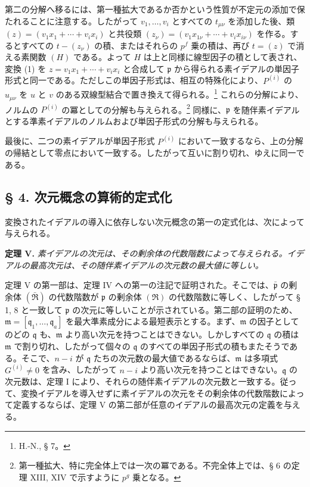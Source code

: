 \documentclass[11pt]{article}
\providecommand{\mR}{\mathfrak{R}}
\providecommand{\frakm}{\mathfrak m}
\providecommand{\frakp}{\mathfrak p}
\providecommand{\frakq}{\mathfrak q}
\providecommand{\mR}{\mathfrak{R}}
\providecommand{\frakp}{\mathfrak p}
\providecommand{\frakq}{\mathfrak q}
\begin{document}
第二の分解へ移るには、第一種拡大であるか否かという性質が不定元の添加で保たれることに注意する。したがって $v_1,\ldots,v_i$ とすべての $t_{\mu\nu}$ を添加した後、類 $(z)=(v_1x_1+\cdots+v_ix_i)$ と共役類 $(z_\nu)=(v_1x_{1\nu}+\cdots+v_ix_{i\nu})$ を作る。するとすべての $t-(z_\nu)$ の積、またはそれらの $p^f$ 乗の積は、再び $t=(z)$ で消える素関数 $(H)$ である。よって $H$ は上と同様に線型因子の積として表され、変換 (1) を $z=v_1x_1+\cdots+v_ix_i$ と合成して $\frakp$ から得られる素イデアルの単因子形式と同一である。ただしこの単因子形式は、相互の特殊化により、$P^{(i)}$ の $u_{\mu\nu}$ を $u$ と $v$ のある双線型結合で置き換えて得られる。\footnote{H.-N., § 7。} これらの分解により、ノルムの $P^{(i)}$ の冪としての分解も与えられる。\footnote{第一種拡大、特に完全体上では一次の冪である。不完全体上では、§ 6 の定理 XIII, XIV で示すように $p^g$ 乗となる。} 同様に、$\frakp$ を随伴素イデアルとする準素イデアルのノルムおよび単因子形式の分解も与えられる。

最後に、二つの素イデアルが単因子形式 $P^{(i)}$ において一致するなら、上の分解の帰結として零点において一致する。したがって互いに割り切れ、ゆえに同一である。

\subsection*{§ 4. 次元概念の算術的定式化}

変換されたイデアルの導入に依存しない次元概念の第一の定式化は、次によって与えられる。

\textbf{定理 V.} \emph{素イデアルの次元は、その剰余体の代数階数によって与えられる。イデアルの最高次元は、その随伴素イデアルの次元数の最大値に等しい。}

定理 V の第一部は、定理 IV への第一の注記で証明された。そこでは、$\bar{\frakp}$ の剰余体 $(\bar{\mR})$ の代数階数が $\frakp$ の剰余体 $(\mR)$ の代数階数に等しく、したがって § 1, 8 と一致して $\frakp$ の次元に等しいことが示されている。第二部の証明のため、$\frakm=[\frakq_1,\ldots,\frakq_a]$ を最大準素成分による最短表示とする。まず、$\frakm$ の因子としてのどの $\frakq$ も、$\frakm$ より高い次元を持つことはできない。しかしすべての $\frakq$ の積は $\frakm$ で割り切れ、したがって個々の $\frakq$ のすべての単因子形式の積もまたそうである。そこで、$n-i$ が $\frakq$ たちの次元数の最大値であるならば、$\frakm$ は多項式 $G^{(i)}\ne0$ を含み、したがって $n-i$ より高い次元を持つことはできない。$\frakq$ の次元数は、定理 I により、それらの随伴素イデアルの次元数と一致する。従って、変換イデアルを導入せずに素イデアルの次元をその剰余体の代数階数によって定義するならば、定理 V の第二部が任意のイデアルの最高次元の定義を与える。
\end{document}
